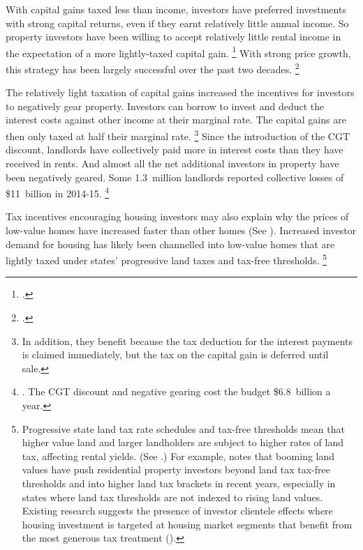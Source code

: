 With capital gains taxed less than income, investors have preferred investments with strong capital returns, even if they earnt relatively little annual income.
So property investors have been willing to accept relatively little rental income in the expectation of a more lightly-taxed capital gain.%
	\footcites{RBA2015SubmissionHomeOwnershipInquiry}{DaleyWood2016-Negative-Gearing-CGT}
With strong price growth, this strategy has been largely successful over the past two decades.%
	\footcite[][9]{DaleyWood2016-Negative-Gearing-CGT}

The relatively light taxation of capital gains increased the incentives for investors to negatively gear property.
Investors can borrow to invest and deduct the interest costs against other income at their marginal rate.
The capital gains are then only taxed at half their marginal rate.%
    \footnote{In addition, they benefit because the tax deduction for the interest payments is claimed immediately,
    but the tax on the capital gain is deferred until sale.}
Since the introduction of the CGT discount, landlords have collectively paid more in interest costs than they have received in rents.
And almost all the net additional investors in property have been negatively geared.
Some 1.3~million landlords reported collective losses of \$11~billion in 2014-15.%
	\footnote{\textcite[][9, 25--26]{DaleyWood2016-Negative-Gearing-CGT}. The CGT discount and negative gearing cost the budget \$6.8~billion a year.}

Tax incentives encouraging housing investors may also explain why the prices of low-value homes have increased faster than other homes (See ). Increased investor demand for housing has likely been channelled into low-value homes that are lightly taxed under states' progressive land taxes and tax-free thresholds.%
    \footnote{Progressive state land tax rate schedules and tax-free thresholds mean that higher value land and larger landholders are subject to higher rates of land tax, affecting rental yields.
    (See .)
    For example, \textcite[][21]{Wood-Ong-AHURI-2010-factors-affecting-landlords} notes that booming land values have push residential property investors beyond land tax tax-free thresholds and into higher land tax brackets in recent years, especially in states where land tax thresholds are not indexed to rising land values. Existing research suggests the presence of investor clientele effects where housing investment is targeted at housing market segments that benefit from the most generous tax treatment (\textcite{Wood-Tu-2004-investor-clienteles-rental-housing}).}


